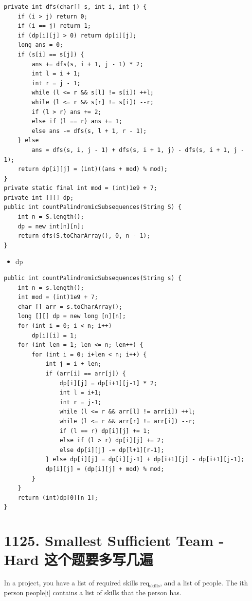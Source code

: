 \documentclass[9pt, b5paaper]{book}
\begin{document}
\begin{verbatim}
private int dfs(char[] s, int i, int j) {
    if (i > j) return 0;
    if (i == j) return 1;
    if (dp[i][j] > 0) return dp[i][j];
    long ans = 0;
    if (s[i] == s[j]) {
        ans += dfs(s, i + 1, j - 1) * 2;
        int l = i + 1;
        int r = j - 1;
        while (l <= r && s[l] != s[i]) ++l;
        while (l <= r && s[r] != s[i]) --r;
        if (l > r) ans += 2;
        else if (l == r) ans += 1;
        else ans -= dfs(s, l + 1, r - 1);
    } else 
        ans = dfs(s, i, j - 1) + dfs(s, i + 1, j) - dfs(s, i + 1, j - 1);
    return dp[i][j] = (int)((ans + mod) % mod);
}
private static final int mod = (int)1e9 + 7;
private int [][] dp;
public int countPalindromicSubsequences(String S) {
    int n = S.length();
    dp = new int[n][n];
    return dfs(S.toCharArray(), 0, n - 1);
}
\end{verbatim}
\begin{itemize}
\item dp
\end{itemize}
\begin{verbatim}
public int countPalindromicSubsequences(String s) {
    int n = s.length();
    int mod = (int)1e9 + 7;
    char [] arr = s.toCharArray();
    long [][] dp = new long [n][n];
    for (int i = 0; i < n; i++) 
        dp[i][i] = 1;
    for (int len = 1; len <= n; len++) {
        for (int i = 0; i+len < n; i++) {
            int j = i + len;
            if (arr[i] == arr[j]) {
                dp[i][j] = dp[i+1][j-1] * 2;
                int l = i+1;
                int r = j-1;
                while (l <= r && arr[l] != arr[i]) ++l;
                while (l <= r && arr[r] != arr[i]) --r;
                if (l == r) dp[i][j] += 1;
                else if (l > r) dp[i][j] += 2;
                else dp[i][j] -= dp[l+1][r-1];
            } else dp[i][j] = dp[i][j-1] + dp[i+1][j] - dp[i+1][j-1];
            dp[i][j] = (dp[i][j] + mod) % mod;
        }
    }
    return (int)dp[0][n-1];
}
\end{verbatim}

\section{1125. Smallest Sufficient Team - Hard 这个题要多写几遍}
\label{sec-2-11}
In a project, you have a list of required skills req$_{\text{skills}}$, and a list of people. The ith person people[i] contains a list of skills that the person has.
\end{document}
